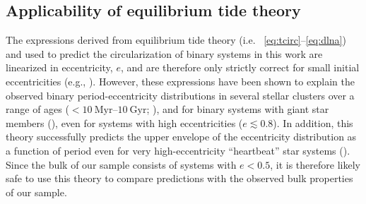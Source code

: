 \documentclass[modern, letterpaper]{aastex62}
\begin{document}
\subsection{Applicability of equilibrium tide theory}
\label{sec:eqtide}


The expressions derived from equilibrium tide theory (i.e. \eqname~\ref{eq:tcirc}--\ref{eq:dlna}) and used to predict the circularization of binary systems in this work are linearized in eccentricity, $e$, and are therefore only strictly correct for small initial eccentricities (e.g., \citealt{Zahn:1989, Mazeh:2007hp}).
However, these expressions have been shown to explain the observed binary period-eccentricity distributions in several stellar clusters over a range of ages ($<10~\textrm{Myr}$--$10~\textrm{Gyr}$; \citealt{Meibom:2005}), and for binary systems with giant star members (\citealt{Verbunt:1995}), even for systems with high eccentricities ($e \lesssim 0.8$).
In addition, this theory successfully predicts the upper envelope of the eccentricity distribution as a function of period even for very high-eccentricity ``heartbeat'' star systems (\citealt{Shporer:2016}).
Since the bulk of our sample consists of systems with $e < 0.5$, it is therefore likely safe to use this theory to compare predictions with the observed bulk properties of our sample.
\end{document}
